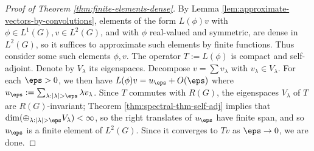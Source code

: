 \documentclass[reqno]{amsart} 
\begin{document}
\begin{proof}
[Proof of Theorem \ref{thm:finite-elements-dense}]
  By Lemma \ref{lem:approximate-vectors-by-convolutions},
  elements of the form $L(\phi) v$ with
  $\phi \in L^1(G), v \in L^2(G)$, and with $\phi$ real-valued and symmetric,
  are dense in $L^2(G)$, so it
  suffices to approximate such elements by finite functions.
  Thus consider some such elements $\phi,v$.
  The operator $T := L(\phi)$ is compact and self-adjoint.
  Denote by $V_\lambda$ its eigenspaces.
  Decompose $v = \sum v_\lambda$ with $v_\lambda \in V_\lambda$.
  For each $\eps > 0$, we then have
  $L(\phi) v = u_\eps + O(\eps)$ where
  $u_\eps := \sum_{\lambda : |\lambda| > \eps} \lambda v_\lambda$.
  Since $T$ commutes with $R(G)$,
  the eigenspaces $V_\lambda$ of $T$ are $R(G)$-invariant;
  Theorem \ref{thm:spectral-thm-self-adj}
  implies that $\dim( \oplus_{\lambda : |\lambda| > \eps}
  V_\lambda) < \infty$,
  so the right translates of $u_\eps$ have finite span,
  and so $u_\eps$ is a finite element of $L^2(G)$.
  Since it converges to $T v$ as $\eps \rightarrow 0$, we are done.
\end{proof}


\end{document}
